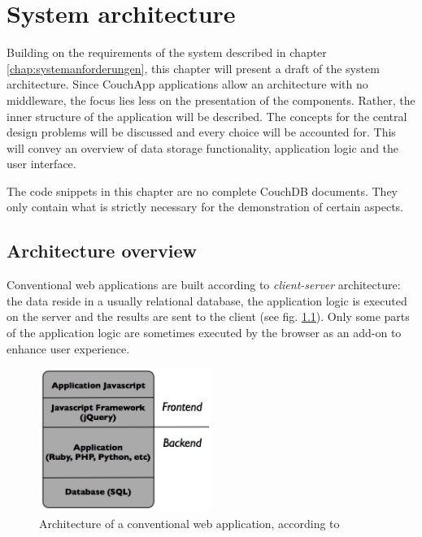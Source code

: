 \chapter{System architecture}
\label{chap:systemarchitektur}

Building on the requirements of the system described in chapter \ref{chap:systemanforderungen}, this chapter will present a draft of the system architecture. Since CouchApp applications allow an architecture with no middleware, the focus lies less on the presentation of the components. Rather, the inner structure of the application will be described. The concepts for the central design problems will be discussed and every choice will be accounted for. This will convey an overview of data storage functionality, application logic and the user interface.

The code snippets in this chapter are no complete CouchDB documents. They only contain what is strictly necessary for the demonstration of certain aspects.

\section{Architecture overview}

Conventional web applications are built according to \textit{client-server} architecture: the data reside in a usually relational database, the application logic is executed on the server and the results are sent to the client (see fig. \ref{fig:old-web-arch}). Only some parts of the application logic are sometimes executed by the browser as an add-on to enhance user experience.

\medskip
\begin{figure}[ht] 
  \begin{center}
    \includegraphics[width=0.5\textwidth]{grafik/old-application-architecture} 
  \end{center}
\caption{Architecture of a conventional web application, according to \cite{web:architecture}}
\label{fig:old-web-arch} 
\end{figure}

